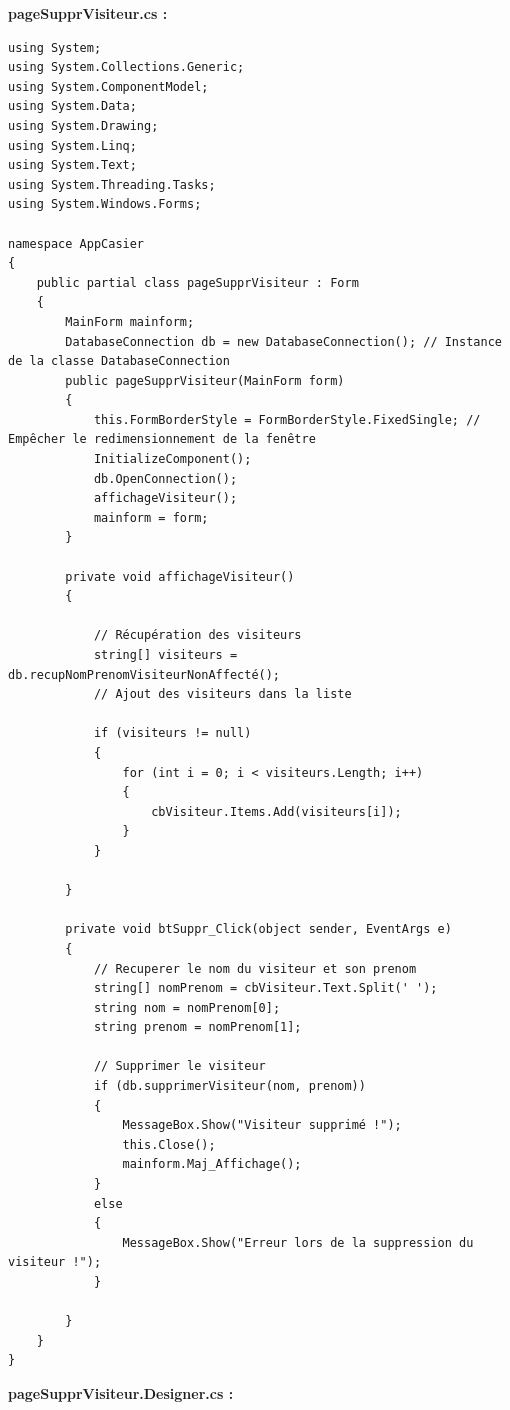 \documentclass[main.tex]{subfiles}
\begin{document}
\textbf{pageSupprVisiteur.cs :}

\begin{lstlisting}
using System;
using System.Collections.Generic;
using System.ComponentModel;
using System.Data;
using System.Drawing;
using System.Linq;
using System.Text;
using System.Threading.Tasks;
using System.Windows.Forms;

namespace AppCasier
{
    public partial class pageSupprVisiteur : Form
    {
        MainForm mainform;
        DatabaseConnection db = new DatabaseConnection(); // Instance de la classe DatabaseConnection
        public pageSupprVisiteur(MainForm form)
        {
            this.FormBorderStyle = FormBorderStyle.FixedSingle; // Empêcher le redimensionnement de la fenêtre
            InitializeComponent();
            db.OpenConnection();
            affichageVisiteur();
            mainform = form;
        }

        private void affichageVisiteur()
        {

            // Récupération des visiteurs
            string[] visiteurs = db.recupNomPrenomVisiteurNonAffecté();
            // Ajout des visiteurs dans la liste

            if (visiteurs != null)
            {
                for (int i = 0; i < visiteurs.Length; i++)
                {
                    cbVisiteur.Items.Add(visiteurs[i]);
                }
            }

        }

        private void btSuppr_Click(object sender, EventArgs e)
        {
            // Recuperer le nom du visiteur et son prenom
            string[] nomPrenom = cbVisiteur.Text.Split(' ');
            string nom = nomPrenom[0];
            string prenom = nomPrenom[1];

            // Supprimer le visiteur
            if (db.supprimerVisiteur(nom, prenom))
            {
                MessageBox.Show("Visiteur supprimé !");
                this.Close();
                mainform.Maj_Affichage();
            }
            else
            {
                MessageBox.Show("Erreur lors de la suppression du visiteur !");
            }

        }
    }
}
\end{lstlisting}

\textbf{pageSupprVisiteur.Designer.cs :}
\end{document}
